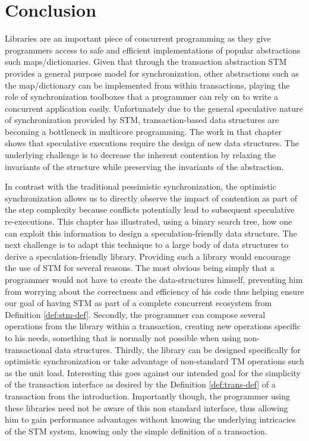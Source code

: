 \section{Conclusion}\label{sec:conclusion}

Libraries are an important piece of concurrent programming
as they give programmers access to safe and efficient implementations
of popular abstractions such maps/dictionaries.
Given that through the transaction
abstraction STM provides a general purpose model for synchronization,
other abstractions such as the map/dictionary can be implemented from within transactions,
playing the role of synchronization toolboxes that a programmer can rely on to write 
a concurrent application easily.
Unfortunately due to the general speculative nature of synchronization provided by STM,
transaction-based data structures are becoming a bottleneck in multicore programming.
The work in that chapter shows that speculative executions require the design of new data structures.
The underlying challenge is to decrease the inherent contention by relaxing the invariants of the structure
while preserving the invariants of the abstraction.

In contrast with the traditional pessimistic synchronization, the optimistic synchronization allows us
to directly observe the impact of contention as part of the step complexity because conflicts potentially lead to subsequent speculative re-executions.
This chapter has illustrated, using a binary search tree, how one can exploit this information
to design a speculation-friendly data structure.
The next challenge is to
adapt this technique to a large body of data structures to derive a speculation-friendly library.
Providing such a library would encourage the use of STM for several reasons.
The most obvious being simply that a programmer would not have to create the data-structures himself,
preventing him from worrying about the correctness and efficiency of his code
thus helping ensure our goal of having STM as part of a complete concurrent ecosystem from Definition \ref{def:stm-def}.
Secondly, the programmer can compose several operations from the library within a transaction, creating
new operations specific to his needs, something that is normally not possible when using non-transactional data structures.
Thirdly, the library can be designed specifically for optimistic synchronization or take advantage of
non-standard TM operations such as the unit load.
Interesting this goes against our intended goal for the simplicity of the transaction interface
as desired by the Definition \ref{def:trans-def} of a transaction from the introduction.
Importantly though, the programmer using these libraries need not be aware of this non standard interface, thus allowing him to
gain performance advantages without knowing the underlying intricacies of the STM system, knowing only the
simple definition of a transaction.




